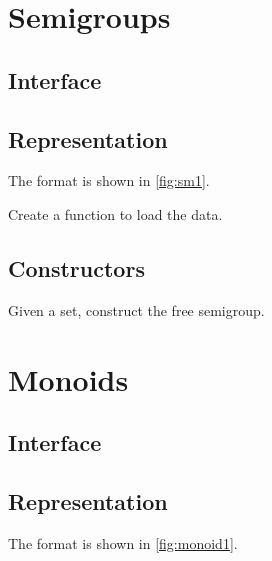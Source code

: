 \section{Semigroups}

\subsection*{Interface}



\subsection*{Representation}

The format is shown in \cref{fig:sm1}.


\begin{exercise}[Representation]
Create a function to load the data.



\end{exercise}

\subsection*{Constructors}

\begin{exercise}
Given a set, construct the free semigroup.

\end{exercise}


\section{Monoids}

\subsection*{Interface}



\subsection*{Representation}

The format is shown in \cref{fig:monoid1}.



